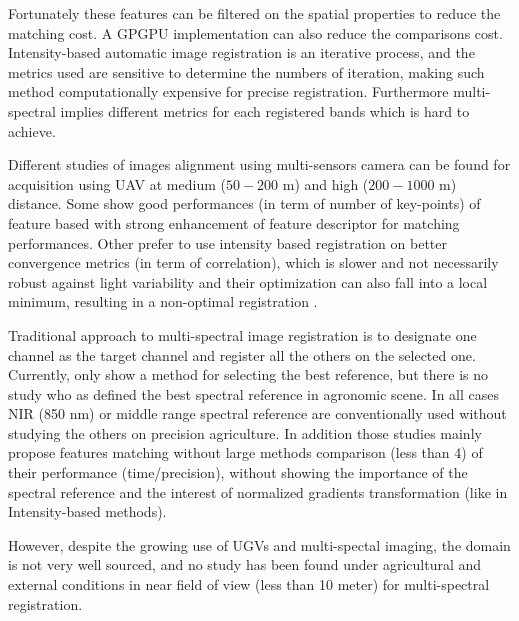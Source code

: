 \documentclass[a4paper,twoside]{article}
\begin{document}
	Fortunately these features can be filtered on the spatial properties to reduce the matching cost. A GPGPU implementation can also reduce the comparisons cost.
	Intensity-based automatic image registration is an iterative process, and the metrics used are sensitive to determine the numbers of iteration,
	making such method computationally expensive for precise registration. Furthermore multi-spectral implies different metrics for each registered bands which is hard to achieve.
	\\
	\par Different studies of images alignment using multi-sensors camera can be found for acquisition using UAV at medium ($50-200$ m) and high ($200-1000$ m) distance.
	Some show good performances (in term of number of key-points) of feature based \cite{DantasDiasJunior} %
	with strong enhancement of feature descriptor for matching performances.
	Other prefer to use intensity based registration \cite{douarre:hal-02183837} on better convergence metrics \cite{8118101} (in term of correlation),
	which is slower and not necessarily robust against light variability and their optimization can also fall into a local minimum,
	resulting in a non-optimal registration \cite{Vioix2004ConceptionER}.
	\\
	\par Traditional approach to multi-spectral image registration is to designate one channel as
	the target channel and register all the others on the selected one.
	Currently, only \cite{DantasDiasJunior} show a method for selecting the best reference,
	but there is no study who as defined the best spectral reference in agronomic scene.
	In all cases NIR (850 nm) or middle range spectral reference are conventionally used without studying the others on precision agriculture.
	In addition those studies mainly propose features matching without large methods comparison \cite{DantasDiasJunior}(less than 4) of their performance (time/precision),
	without showing the importance of the spectral reference and the interest of normalized gradients transformation (like in Intensity-based methods).
	\\
	\par However, despite the growing use of UGVs and multi-spectal imaging, the domain is not very well sourced,
	and no study has been found under agricultural and external conditions in near field of view (less than 10 meter) for multi-spectral registration.
\end{document}

